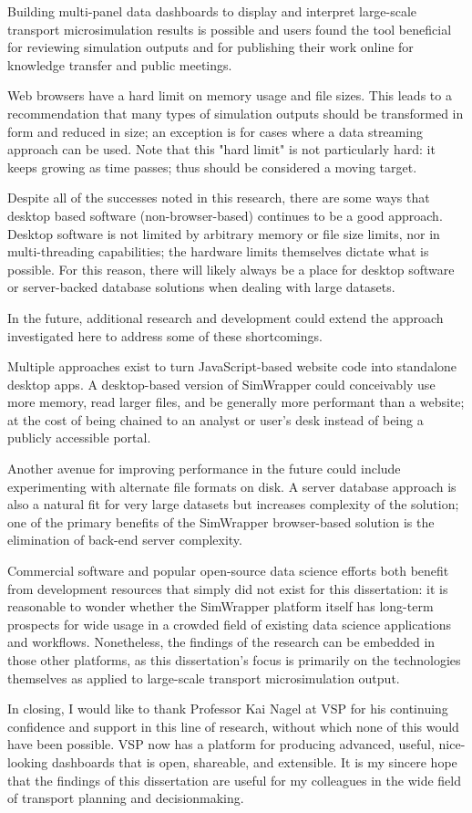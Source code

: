 Building multi-panel data dashboards to display and interpret large-scale transport microsimulation results is possible and users found the tool beneficial for reviewing simulation outputs and for publishing their work online for knowledge transfer and public meetings.

Web browsers have a hard limit on memory usage and file sizes. This leads to a recommendation that many types of simulation outputs should be transformed in form and reduced in size; an exception is for cases where a data streaming approach can be used. Note that this "hard limit" is not particularly hard: it keeps growing as time passes; thus should be considered a moving target.

Despite all of the successes noted in this research, there are some ways that desktop based software (non-browser-based) continues to be a good approach. Desktop software is not limited by arbitrary memory or file size limits, nor in multi-threading capabilities; the hardware limits themselves dictate what is possible. For this reason, there will likely always be a place for desktop software or server-backed database solutions when dealing with large datasets.

In the future, additional research and development could extend the approach investigated here to address some of these shortcomings.

Multiple approaches exist to turn JavaScript-based website code into standalone desktop apps. A desktop-based version of SimWrapper could conceivably use more memory, read larger files, and be generally more performant than a website; at the cost of being chained to an analyst or user's desk instead of being a publicly accessible portal.

Another avenue for improving performance in the future could include experimenting with alternate file formats on disk. A server database approach is also a natural fit for very large datasets but increases complexity of the solution; one of the primary benefits of the SimWrapper browser-based solution is the elimination of back-end server complexity.

Commercial software and popular open-source data science efforts both benefit from development resources that simply did not exist for this dissertation: it is reasonable to wonder whether the SimWrapper platform itself has long-term prospects for wide usage in a crowded field of existing data science applications and workflows. Nonetheless, the findings of the research can be embedded in those other platforms, as this dissertation's focus is primarily on the technologies themselves as applied to large-scale transport microsimulation output.

In closing, I would like to thank Professor Kai Nagel at VSP for his continuing confidence and support in this line of research, without which none of this would have been possible. VSP now has a platform for producing advanced, useful, nice-looking dashboards that is open, shareable, and extensible. It is my sincere hope that the findings of this dissertation are useful for my colleagues in the wide field of transport planning and decisionmaking.
